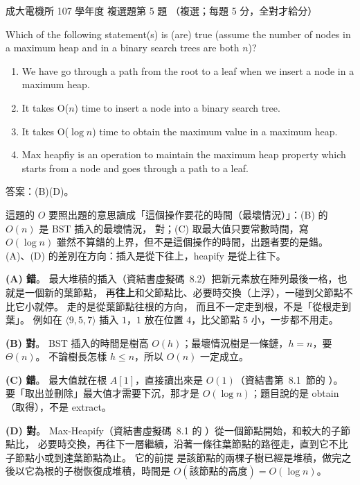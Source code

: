 \begin{pastexam}[label={px:ncku-107-ee-ds-04}]{成大電機所 107 學年度 複選題第 5 題}
（複選；每題 5 分，全對才給分）

Which of the following statement(s) is (are) true (assume the number of nodes in a maximum heap and
in a binary search trees are both $n$)?
\begin{enumerate}[label=(\Alph*)]
\item We have go through a path from the root to a leaf when we insert a node in a maximum heap.
\item It takes O($n$) time to insert a node into a binary search tree.
\item It takes O($\log n$) time to obtain the maximum value in a maximum heap.
\item Max heapfiy is an operation to maintain the maximum heap property which starts from a node and
goes through a path to a leaf.
\end{enumerate}
\end{pastexam}

\begin{pastsoln}
答案：(B)(D)。

這題的 $O$ 要照出題的意思讀成「這個操作要花的時間（最壞情況）」：(B) 的 $O(n)$ 是 BST 插入的最壞情況，
對；(C) 取最大值只要常數時間，寫 $O(\log n)$ 雖然不算錯的上界，但不是這個操作的時間，出題者要的是錯。
(A)、(D) 的差別在方向：插入是從下往上，heapify 是從上往下。

\textbf{(A) 錯}。 最大堆積的插入（資結書虛擬碼~8.2）把新元素放在陣列最後一格，也就是一個新的葉節點，
再\textbf{往上}和父節點比、必要時交換（上浮），一碰到父節點不比它小就停。 走的是從葉節點往根的方向，
而且不一定走到根，不是「從根走到葉」。 例如在 $\langle 9, 5, 7 \rangle$ 插入 $1$，$1$ 放在位置 $4$，比父節點
$5$ 小，一步都不用走。

\textbf{(B) 對}。 BST 插入的時間是樹高 $O(h)$；最壞情況樹是一條鏈，$h = n$，要 $\Theta(n)$。 不論樹長怎樣
$h \le n$，所以 $O(n)$ 一定成立。

\textbf{(C) 錯}。 最大值就在根 $A[1]$，直接讀出來是 $O(1)$（資結書第~8.1~節的 ）。
要「取出並刪除」最大值才需要下沉，那才是 $O(\log n)$；題目說的是 obtain（取得），不是 extract。

\textbf{(D) 對}。 Max-Heapify（資結書虛擬碼~8.1 的 ）從一個節點開始，和較大的子節點比，
必要時交換，再往下一層繼續，沿著一條往葉節點的路徑走，直到它不比子節點小或到達葉節點為止。 它的前提
是該節點的兩棵子樹已經是堆積，做完之後以它為根的子樹恢復成堆積，時間是 $O(\text{該節點的高度}) = O(\log n)$。
\end{pastsoln}
